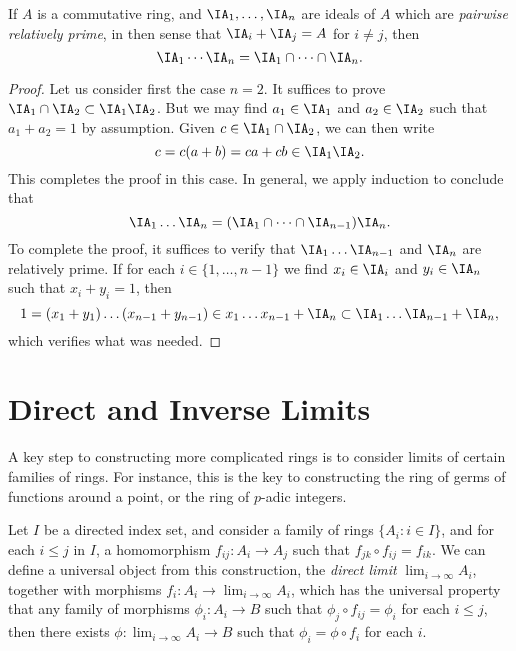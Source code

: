 \begin{lemma}
    If $A$ is a commutative ring, and $\IA_1,\dots, \IA_n$ are ideals of $A$ which are \emph{pairwise relatively prime}, in then sense that $\IA_i + \IA_j = A$ for $i \neq j$, then
    \[ \IA_1 \cdots \IA_n = \IA_1 \cap \dots \cap \IA_n. \]
\end{lemma}
\begin{proof}
    Let us consider first the case $n = 2$. It suffices to prove $\IA_1 \cap \IA_2 \subset \IA_1 \IA_2$. But we may find $a_1 \in \IA_1$ and $a_2 \in \IA_2$ such that $a_1 + a_2 = 1$ by assumption. Given $c \in \IA_1 \cap \IA_2$, we can then write
    \[ c = c(a + b) = ca + cb \in \IA_1 \IA_2. \]
    This completes the proof in this case. In general, we apply induction to conclude that
    \[ \IA_1 \dots \IA_n = (\IA_1 \cap \dots \cap \IA_{n-1}) \IA_n. \]
    To complete the proof, it suffices to verify that $\IA_1 \dots \IA_{n-1}$ and $\IA_n$ are relatively prime. If for each $i \in \{ 1, \dots, n-1 \}$ we find $x_i \in \IA_i$ and $y_i \in \IA_n$ such that $x_i + y_i = 1$, then
    \[ 1 = (x_1 + y_1) \dots (x_{n-1} + y_{n-1}) \in x_1 \dots x_{n-1} + \IA_n \subset \IA_1 \dots \IA_{n-1} + \IA_n, \]
    which verifies what was needed.
\end{proof}

\section{Direct and Inverse Limits}

A key step to constructing more complicated rings is to consider limits of certain families of rings. For instance, this is the key to constructing the ring of germs of functions around a point, or the ring of $p$-adic integers.

Let $I$ be a directed index set, and consider a family of rings $\{ A_i : i \in I \}$, and for each $i \leq j$ in $I$, a homomorphism $f_{ij}: A_i \to A_j$ such that $f_{jk} \circ f_{ij} = f_{ik}$. We can define a universal object from this construction, the \emph{direct limit} $\lim_{i \to \infty} A_i$, together with morphisms $f_i: A_i \to \lim_{i \to \infty} A_i$, which has the universal property that any family of morphisms $\phi_i: A_i \to B$ such that $\phi_j \circ f_{ij} = \phi_i$ for each $i \leq j$, then there exists $\phi: \lim_{i \to \infty} A_i \to B$ such that $\phi_i = \phi \circ f_i$ for each $i$.


